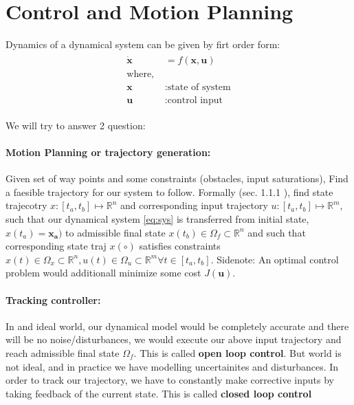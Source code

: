 \section{Control and Motion Planning}

Dynamics of a dynamical system can be given by firt order form:
\begin{align}
    \begin{split}
        \label{eq:sys}
        \dot{\mathbf{x}} &= f(\mathbf{x}, \mathbf{u}) \\   
        \text{where, }\\
        \mathbf{x} &: \text{state of system} \\
        \mathbf{u} &: \text{control input}     
    \end{split}
\end{align}

We will try to answer 2 question:

\paragraph{Motion Planning or trajectory generation:} Given set of way points and some constraints (obstacles, input saturations), Find a faesible trajectory for our system to follow. Formally (sec. 1.1.1 \cite{geering2007optimal}), find state trajecotry $x:[t_a,t_b] \mapsto \mathbb{R}^n$ and corresponding input trajectory $u:[t_a,t_b] \mapsto \mathbb{R}^m$,  such that our dynamical system \eqref{eq:sys} is transferred from initial state, $x(t_a)=\mathbf{x_a})$ to admissible final state $x(t_b) \in \Omega_f \subset \mathbb{R}^n$ and such that corresponding state traj $x(\circ)$ satisfies constraints $x(t) \in \Omega_x \subset \mathbb{R}^n , u(t) \in \Omega_u \subset \mathbb{R}^m \forall t\in [t_a, t_b]$. Sidenote: An optimal control problem would additionall
minimize some cost $J(\textbf{u})$.

\paragraph{Tracking controller: } In and ideal world, our dynamical model would be completely accurate and there will be no noise/disturbances, we would execute our above input trajectory and reach admissible final state $\Omega_f$. This is called \textbf{open loop control}. But world is not ideal, and in practice we have modelling uncertainites and disturbances. In order to track our trajectory, we have to constantly make corrective inputs by taking feedback of the current state. This is called \textbf{closed loop control}

